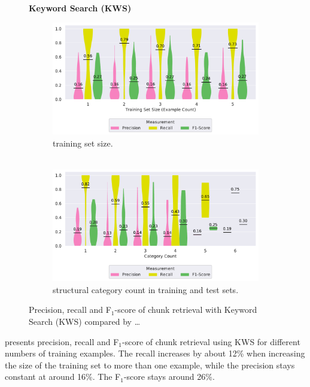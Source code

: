 \begin{figure}
\centering
    \textbf{Keyword Search (KWS)}\par\medskip
\begin{subfigure}[b]{\columnwidth}
		\centering
		\includegraphics[width=\columnwidth,
		clip]{img/big-study/recall-precision-examplecount-KWS.pdf}
		\caption{training set size.\\ \,}
		\label{fig:recall-precision-examplecount-KWS}
\end{subfigure}\hspace{\fill}
\begin{subfigure}[b]{\columnwidth}
		\centering
		\includegraphics[width=\columnwidth,
		clip]{img/big-study/recall-precision-categorycount-KWS.pdf}
		\caption{structural category count
		in training and test sets.}
		\label{fig:recall-precision-categorycount-KWS}
\end{subfigure}
\caption{Precision, recall and F$_{1}$-score of chunk retrieval with
Keyword Search (KWS) compared by \ldots}
\end{figure}


 presents precision,
recall and F$_{1}$-score of chunk retrieval using KWS for different
numbers of training examples.
The recall increases by about 12\% when
increasing the size of the training set to more than one example,
while the precision stays constant at around 16\%.
The F$_{1}$-score
stays around 26\%.


